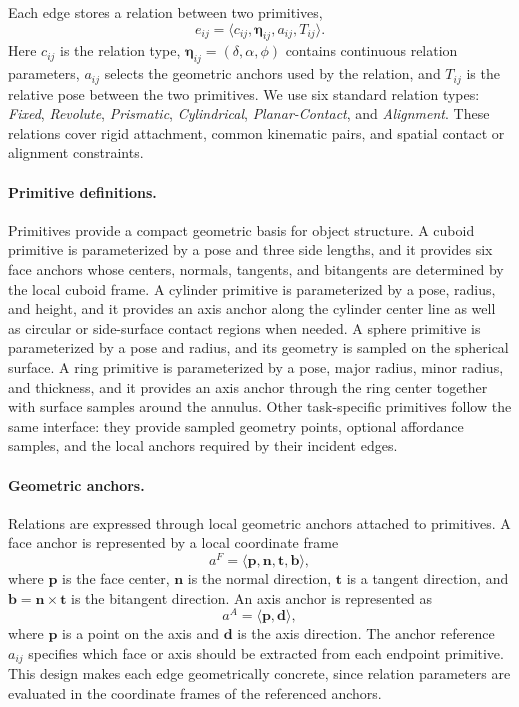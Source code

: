 Each edge stores a relation between two primitives,
\begin{equation}
e_{ij}=\langle c_{ij}, \boldsymbol{\eta}_{ij}, a_{ij}, T_{ij} \rangle .
\end{equation}
Here $c_{ij}$ is the relation type, $\boldsymbol{\eta}_{ij}=(\delta,\alpha,\phi)$ contains continuous relation parameters, $a_{ij}$ selects the geometric anchors used by the relation, and $T_{ij}$ is the relative pose between the two primitives. We use six standard relation types: \textit{Fixed}, \textit{Revolute}, \textit{Prismatic}, \textit{Cylindrical}, \textit{Planar-Contact}, and \textit{Alignment}. These relations cover rigid attachment, common kinematic pairs, and spatial contact or alignment constraints.

\paragraph{Primitive definitions.}
Primitives provide a compact geometric basis for object structure. A cuboid primitive is parameterized by a pose and three side lengths, and it provides six face anchors whose centers, normals, tangents, and bitangents are determined by the local cuboid frame. A cylinder primitive is parameterized by a pose, radius, and height, and it provides an axis anchor along the cylinder center line as well as circular or side-surface contact regions when needed. A sphere primitive is parameterized by a pose and radius, and its geometry is sampled on the spherical surface. A ring primitive is parameterized by a pose, major radius, minor radius, and thickness, and it provides an axis anchor through the ring center together with surface samples around the annulus. Other task-specific primitives follow the same interface: they provide sampled geometry points, optional affordance samples, and the local anchors required by their incident edges.

\paragraph{Geometric anchors.}
Relations are expressed through local geometric anchors attached to primitives. A face anchor is represented by a local coordinate frame
\begin{equation}
a^{F}=\langle \mathbf{p},\mathbf{n},\mathbf{t},\mathbf{b}\rangle ,
\end{equation}
where $\mathbf{p}$ is the face center, $\mathbf{n}$ is the normal direction, $\mathbf{t}$ is a tangent direction, and $\mathbf{b}=\mathbf{n}\times\mathbf{t}$ is the bitangent direction. An axis anchor is represented as
\begin{equation}
a^{A}=\langle \mathbf{p},\mathbf{d}\rangle ,
\end{equation}
where $\mathbf{p}$ is a point on the axis and $\mathbf{d}$ is the axis direction. The anchor reference $a_{ij}$ specifies which face or axis should be extracted from each endpoint primitive. This design makes each edge geometrically concrete, since relation parameters are evaluated in the coordinate frames of the referenced anchors.

